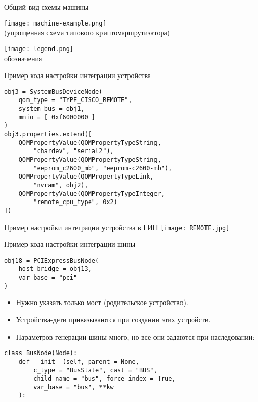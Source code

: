 \documentclass[unicode,hyperref={unicode=true}]{beamer}
\theoremstyle{definition}
\theoremstyle{plain}
\begin{document}
\begin{frame}{Общий вид схемы машины}
\begin{minipage}[b]{0.71\textwidth}
\texttt{[image: machine-example.png]}\\
(упрощенная схема типового криптомаршрутизатора)
\end{minipage}
\hfill
\begin{minipage}[t]{0.24\textwidth}
\texttt{[image: legend.png]}\\
обозначения
\end{minipage}
\end{frame}



\begin{frame}[fragile]{Пример кода настройки интеграции устройства}
\lstset{language=Python}
\begin{lstlisting}
obj3 = SystemBusDeviceNode(
    qom_type = "TYPE_CISCO_REMOTE",
    system_bus = obj1,
    mmio = [ 0xf6000000 ]
)
obj3.properties.extend([
    QOMPropertyValue(QOMPropertyTypeString,
        "chardev", "serial2"),
    QOMPropertyValue(QOMPropertyTypeString,
        "eeprom_c2600_mb", "eeprom-c2600-mb"),
    QOMPropertyValue(QOMPropertyTypeLink,
        "nvram", obj2),
    QOMPropertyValue(QOMPropertyTypeInteger,
        "remote_cpu_type", 0x2)
])
\end{lstlisting}

\end{frame}



\begin{frame}{Пример настройки интеграции устройства в ГИП}
\texttt{[image: REMOTE.jpg]}
\end{frame}



\begin{frame}[fragile]{Пример кода настройки интеграции шины}
\lstset{language=Python}
\begin{lstlisting}
obj18 = PCIExpressBusNode(
    host_bridge = obj13,
    var_base = "pci"
)
\end{lstlisting}
\vfill
\begin{itemize}
\item Нужно указать только мост (родительское устройство).
\item Устройства-дети привязываются при создании этих устройств.
\item Параметров генерации шины много, но все они задаются при наследовании:
\end{itemize}
\vfill
\lstset{language=Python}
\begin{lstlisting}
class BusNode(Node):
    def __init__(self, parent = None,
        c_type = "BusState", cast = "BUS",
        child_name = "bus", force_index = True,
        var_base = "bus", **kw
    ):
\end{lstlisting}
\end{frame}
\end{document}
